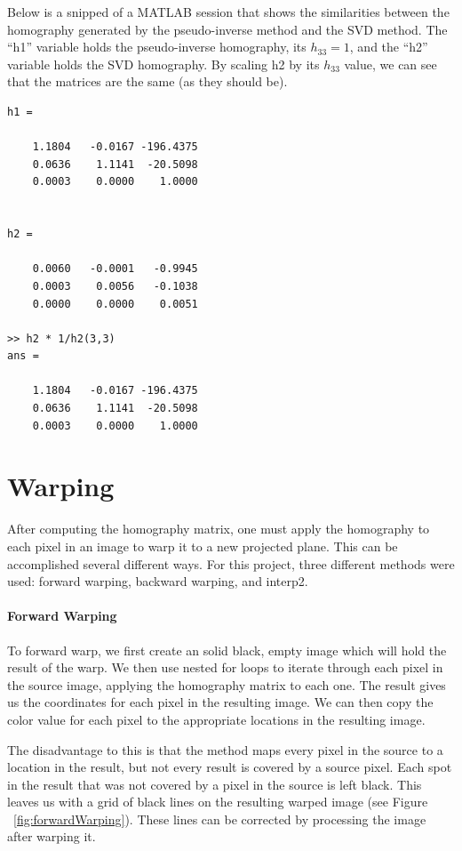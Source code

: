 \documentclass[11pt, letterpaper]{article}
\begin{document}
Below is a snipped of a MATLAB session that shows the similarities
between the homography generated by the pseudo-inverse method and the
SVD method. The ``h1'' variable holds the pseudo-inverse homography,
its $h_{33}=1$, and the ``h2'' variable holds the SVD homography. By
scaling h2 by its $h_{33}$ value, we can see that the matrices are the
same (as they should be).

\begin{verbatim}
h1 =

    1.1804   -0.0167 -196.4375
    0.0636    1.1141  -20.5098
    0.0003    0.0000    1.0000


h2 =

    0.0060   -0.0001   -0.9945
    0.0003    0.0056   -0.1038
    0.0000    0.0000    0.0051

>> h2 * 1/h2(3,3)
ans =

    1.1804   -0.0167 -196.4375
    0.0636    1.1141  -20.5098
    0.0003    0.0000    1.0000
\end{verbatim}

\section{Warping}
After computing the homography matrix, one must apply the homography
to each pixel in an image to warp it to a new projected plane. This
can be accomplished several different ways. For this project, three
different methods were used: forward warping, backward warping, and
interp2.

\paragraph{Forward Warping}
To forward warp, we first create an solid black, empty image which
will hold the result of the warp. We then use nested for loops to
iterate through each pixel in the source image, applying the
homography matrix to each one. The result gives us the coordinates for
each pixel in the resulting image. We can then copy the color value
for each pixel to the appropriate locations in the resulting
image. 

The disadvantage to this is that the method maps every pixel in the
source to a location in the result, but not every result is covered by
a source pixel. Each spot in the result that was not covered by a
pixel in the source is left black. This leaves us with a grid of black
lines on the resulting warped image (see Figure
~\ref{fig:forwardWarping}). These lines can be corrected by processing
the image after warping it.
\end{document}
